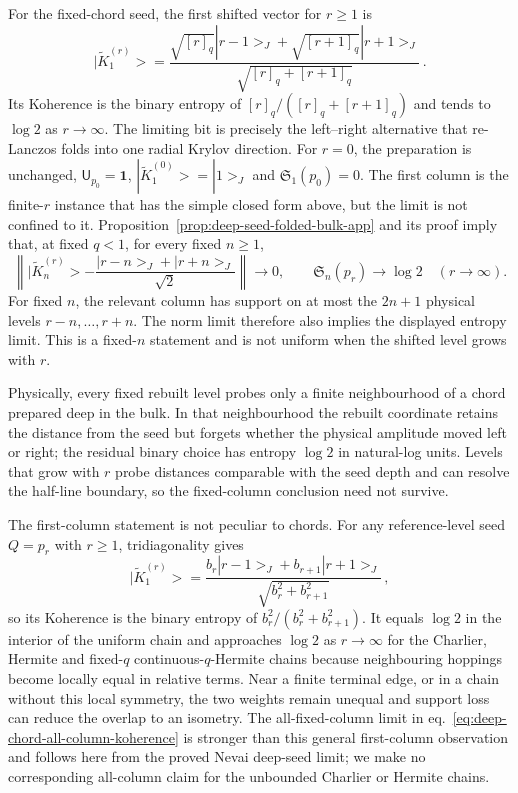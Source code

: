 \documentclass[a4paper,11pt]{article}
\def\ket#1{|#1>}%
\def\Jac{J}%
\theoremstyle{definition}
\theoremstyle{remark}
\newcommand{\ket}[1]{|#1\rangle}
\newcommand{\Jac}{\mathsf J}
\newcommand{\Id}{\mathbf 1}
\begin{document}
For the fixed-chord seed, the first shifted vector for $r\ge1$ is
\begin{equation}
   \ket{\widetilde K_1^{(r)}}
   =\frac{\sqrt{[r]_q}\ket{r-1}_{\Jac}
          +\sqrt{[r+1]_q}\ket{r+1}_{\Jac}}
          {\sqrt{[r]_q+[r+1]_q}}\,.
   \label{eq:deep-chord-first-koherence}
\end{equation}
Its Koherence is the binary entropy of
$[r]_q/([r]_q+[r+1]_q)$ and tends to $\log2$ as $r\to\infty$.  The limiting bit is precisely the
left--right alternative that re-Lanczos folds into one radial Krylov direction.
For $r=0$, the preparation is unchanged, $\mathsf U_{p_0}=\Id$,
$\ket{\widetilde K_1^{(0)}}=\ket1_{\Jac}$ and $\mathfrak S_1(p_0)=0$.
The first column is the finite-$r$ instance that has the simple closed form above, but the
limit is not confined to it.  Proposition~\ref{prop:deep-seed-folded-bulk-app} and its proof imply
that, at fixed $q<1$, for every fixed $n\ge1$,
\begin{equation}
   \left\|
      \ket{\widetilde K_n^{(r)}}
      -\frac{\ket{r-n}_{\Jac}+\ket{r+n}_{\Jac}}{\sqrt2}
   \right\|\longrightarrow0,
   \qquad
   \mathfrak S_n(p_r)\longrightarrow\log2
   \quad(r\to\infty).
   \label{eq:deep-chord-all-column-koherence}
\end{equation}
For fixed $n$, the relevant column has support on at most the $2n+1$ physical levels
$r-n,\ldots,r+n$.  The norm limit therefore also implies the displayed entropy limit.
This is a fixed-$n$ statement and is not uniform when the shifted level grows with $r$. 

Physically, every fixed rebuilt level probes only a finite neighbourhood of a chord prepared
deep in the bulk.  In that neighbourhood the rebuilt coordinate retains the distance from the
seed but forgets whether the physical amplitude moved left or right; the residual binary choice
has entropy $\log2$ in natural-log units.  Levels that grow with $r$ probe distances comparable with the
seed depth and can resolve the half-line boundary, so the fixed-column conclusion need not survive.

	The first-column statement is not peculiar to chords.  For any reference-level seed
	$Q=p_r$ with $r\ge1$, tridiagonality gives
	\begin{equation}
		\ket{\widetilde K_1^{(r)}}=
		\frac{b_r\ket{r-1}_{\Jac}+b_{r+1}\ket{r+1}_{\Jac}}
		{\sqrt{b_r^2+b_{r+1}^2}}\,,
	\end{equation}
	so its Koherence is the binary entropy of $b_r^2/(b_r^2+b_{r+1}^2)$.
	It equals $\log2$ in the interior of the uniform chain and approaches $\log2$ as $r\to\infty$
	for the Charlier, Hermite and fixed-$q$ continuous-$q$-Hermite chains because neighbouring hoppings become locally
	equal in relative terms.  Near a finite terminal edge, or in a chain without this local symmetry,
	the two weights remain unequal and support loss can reduce the overlap to an isometry.  The
	all-fixed-column limit in eq.~\eqref{eq:deep-chord-all-column-koherence} is stronger than this
	general first-column observation and follows here from the proved Nevai deep-seed limit; we make
	no corresponding all-column claim for the unbounded Charlier or Hermite chains.
\end{document}
